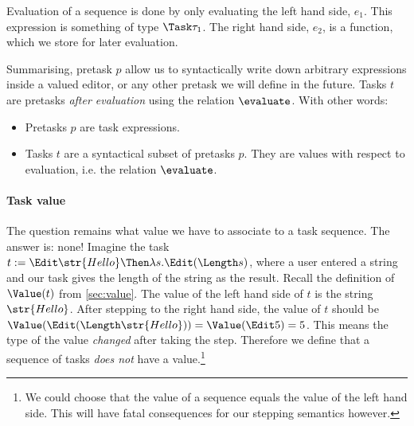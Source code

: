 Evaluation of a sequence is done by only evaluating the left hand side, $e_1$.
This expression is something of type $\Task \tau_1$.
The right hand side, $e_2$, is a function,
which we store for later evaluation.


Summarising, pretask $p$ allow us to syntactically write down arbitrary expressions inside a valued editor,
or any other pretask we will define in the future.
Tasks $t$ are pretasks \emph{after evaluation} using the relation $\evaluate$.
With other words:
\begin{itemize}
  \item
    Pretasks $p$ are task expressions.
  \item
    Tasks $t$ are a syntactical subset of pretasks $p$.
    They are values with respect to evaluation, i.e. the relation $\evaluate$.
\end{itemize}







\paragraph{Task value}

The question remains what value we have to associate to a task sequence.
The answer is: none!
Imagine the task $t := \Edit \str{Hello} \Then \lambda s.\allowbreak\Edit (\Length s)$,
where a user entered a string and our task gives the length of the string as the result.
Recall the definition of $\Value(t)$ from \autoref{sec:value}.
The value of the left hand side of $t$ is the string $\str{Hello}$.
After stepping to the right hand side,
the value of $t$ should be $\Value(\Edit (\Length\str{Hello})) = \Value(\Edit 5) = 5$.
This means the type of the value \emph{changed} after taking the step.
Therefore we define that a sequence of tasks \emph{does not} have a value.\footnote{
  We could choose that the value of a sequence equals the value of the left hand side.
  This will have fatal consequences for our stepping semantics however.
}

